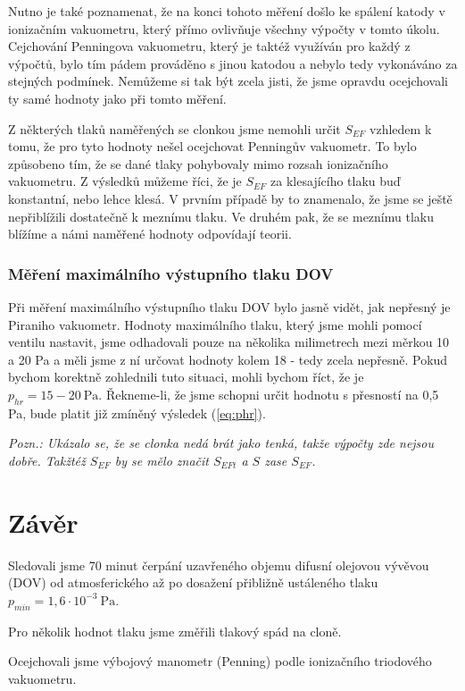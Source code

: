 \documentclass[english]{article}
\newcommand{\unit}[1]{~\mathrm{#1}}
\begin{document}
			Nutno je také poznamenat, že na konci tohoto měření došlo ke spálení katody v ionizačním vakuometru, který přímo ovlivňuje všechny výpočty v tomto úkolu. Cejchování Penningova vakuometru, který je taktéž využíván pro každý z výpočtů, bylo tím pádem prováděno s jinou katodou a nebylo tedy vykonáváno za stejných podmínek. Nemůžeme si tak být zcela jisti, že jsme opravdu ocejchovali ty samé hodnoty jako při tomto měření.
			
			Z některých tlaků naměřených se clonkou jsme nemohli určit $S_{EF}$ vzhledem k tomu, že pro tyto hodnoty nešel ocejchovat Penningův vakuometr. To bylo způsobeno tím, že se dané tlaky pohybovaly mimo rozsah ionizačního vakuometru. Z výsledků můžeme říci, že je $S_{EF}$ za klesajícího tlaku buď konstantní, nebo lehce klesá. V prvním případě by to znamenalo, že jsme se ještě nepřiblížili dostatečně k meznímu tlaku. Ve druhém pak, že se meznímu tlaku blížíme a námi naměřené hodnoty odpovídají teorii.
	
		\subsubsection{Měření maximálního výstupního tlaku DOV}
			Při měření maximálního výstupního tlaku DOV bylo jasně vidět, jak nepřesný je Piraniho vakuometr. Hodnoty maximálního tlaku, který jsme mohli pomocí ventilu nastavit, jsme odhadovali pouze na několika milimetrech mezi měrkou 10 a 20 Pa a měli jsme z ní určovat hodnoty kolem 18 - tedy zcela nepřesně. Pokud bychom korektně zohlednili tuto situaci, mohli bychom říct, že je $p_{hr} = 15-20\unit{Pa}$. Řekneme-li, že jsme schopni určit hodnotu s přesností na 0,5 Pa, bude platit již zmíněný výsledek (\ref{eq:phr}).
			
		\emph{Pozn.: Ukázalo se, že se clonka nedá brát jako tenká, takže výpočty zde nejsou dobře. Takžtéž $S_{EF}$ by se mělo značit $S_{EFt}$ a $S$ zase $S_{EF}$.}
						
\section{Závěr}
	Sledovali jsme 70 minut čerpání uzavřeného objemu difusní olejovou vývěvou (DOV) od atmosferického až po dosažení přibližně ustáleného tlaku $p_{min}=1,6\cdot 10^{-3}\unit{Pa}$. 
	
	Pro několik hodnot tlaku jsme změřili tlakový spád na cloně.
	
	Ocejchovali jsme výbojový manometr (Penning) podle ionizačního triodového vakuometru.
	
\end{document}
